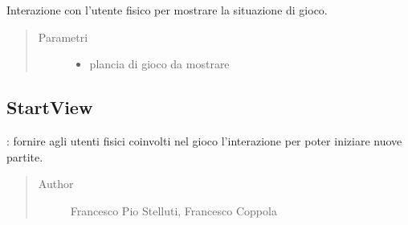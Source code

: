 \documentclass[letterpaper,10pt,italian,openany,oneside]{sphinxmanual}
\begin{document}
\begin{fulllineitems}
\label{\detokenize{test/it/unicam/cs/pa/mastermind/ui/GameView:it.unicam.cs.pa.mastermind.ui.GameView.showGame(BoardModel)}}
Interazione con l’utente fisico per mostrare la situazione di gioco.
\begin{quote}\begin{description}
\item[{Parametri}] \leavevmode\begin{itemize}
\item {} 
 \textendash{} plancia di gioco da mostrare

\end{itemize}

\end{description}\end{quote}

\end{fulllineitems}



\subsection{StartView}
\label{\detokenize{test/it/unicam/cs/pa/mastermind/ui/StartView:startview}}\label{\detokenize{test/it/unicam/cs/pa/mastermind/ui/StartView::doc}}

\begin{fulllineitems}
\label{\detokenize{test/it/unicam/cs/pa/mastermind/ui/StartView:it.unicam.cs.pa.mastermind.ui.StartView}}
: fornire agli utenti fisici coinvolti nel gioco l’interazione per poter iniziare nuove partite.
\begin{quote}\begin{description}
\item[{Author}] \leavevmode
Francesco Pio Stelluti, Francesco Coppola

\end{description}\end{quote}

\end{fulllineitems}
\end{document}
